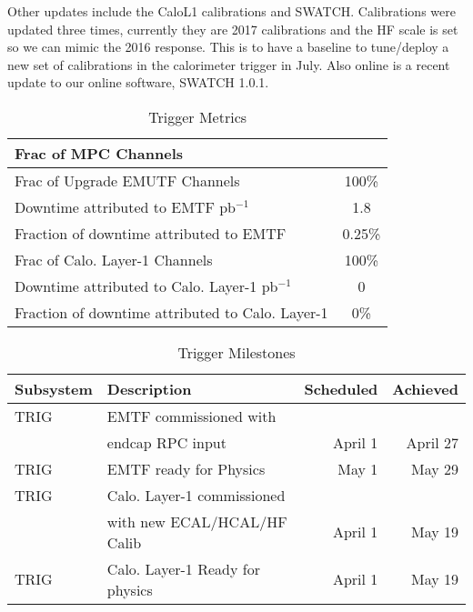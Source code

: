 Other updates include the CaloL1 calibrations and SWATCH.  Calibrations were updated three times, currently they are 2017 calibrations and the HF scale is set so we can mimic the 2016 response.  This is to have a baseline to tune/deploy a new set of calibrations in the calorimeter trigger in July.  Also online is a recent update to our online software, SWATCH 1.0.1.
 
\begin{table}[htp]
\caption{Trigger Metrics}
\begin{center}
\begin{tabular}{|l|c|}
\hline
Frac of MPC Channels& \\
\hline
Frac of Upgrade EMUTF Channels& 100\% \\
\hline
Downtime attributed to EMTF pb$^{-1}$ & 1.8 \\
Fraction of downtime attributed to EMTF& 0.25\% \\
\hline
Frac of Calo. Layer-1 Channels & 100\% \\
\hline
Downtime attributed to Calo. Layer-1 pb$^{-1}$ &  0\\
Fraction of downtime attributed to Calo. Layer-1&  0\% \\
\hline
\end{tabular}
\end{center}
\label{TriggerMetrics}
\end{table}%
 
\begin{table}[h]
\caption{Trigger Milestones }
\begin{center}
\begin{tabular}{|l|l|r|r|}
\hline
Subsystem&Description&Scheduled&Achieved\\
\hline
TRIG&EMTF commissioned with & & \\
    & endcap RPC input &April 1 & April 27 \\
\hline
TRIG&EMTF ready for Physics &May 1& May 29\\
\hline
TRIG&Calo. Layer-1 commissioned &&\\
& with new ECAL/HCAL/HF Calib & April 1 & May 19\\
\hline
TRIG&Calo. Layer-1 Ready for physics&April  1&  May 19\\
\hline
\end{tabular}
\end{center}
\label{TriggerMilestones}
\end{table}%

